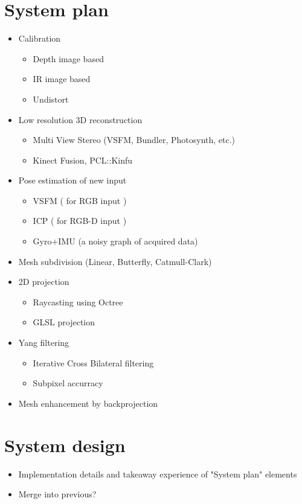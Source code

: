 \documentclass[12pt,a4paper]{article}
\begin{document}
\section{System plan}
	\begin{itemize}
		\item Calibration
			\begin{itemize}
				\item Depth image based
				\item IR image based
				\item Undistort
			\end{itemize}
		\item Low resolution 3D reconstruction
			\begin{itemize}
				\item Multi View Stereo (VSFM, Bundler, Photosynth, etc.)
				\item Kinect Fusion, PCL::Kinfu
			\end{itemize}
		\item Pose estimation of new input
			\begin{itemize}
				\item VSFM ( for RGB input )
				\item ICP ( for RGB-D input )
				\item Gyro+IMU (a noisy graph of acquired data)
			\end{itemize}
		\item Mesh subdivision (Linear, Butterfly, Catmull-Clark)
		\item 2D projection
			\begin{itemize}
 				\item Raycasting using Octree
				\item GLSL projection
			\end{itemize}
		\item Yang filtering
			\begin{itemize}
				\item Iterative Cross Bilateral filtering
				\item Subpixel accurracy
			\end{itemize}
		\item Mesh enhancement by backprojection
	\end{itemize}
	
\section{System design}
	\begin{itemize}
		\item Implementation details and takeaway experience of "System plan" elements
		\item Merge into previous?
	\end{itemize}
	
\end{document}
